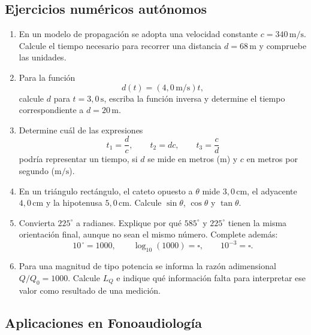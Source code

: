 \subsection*{Ejercicios numéricos autónomos}

\begin{enumerate}[label=\textbf{NA\arabic*.},leftmargin=*]
    \item En un modelo de propagación se adopta una velocidad constante \(c=340\,\text{m}/\text{s}\). Calcule el tiempo necesario para recorrer una distancia \(d=68\,\text{m}\) y compruebe las unidades.

    \item Para la función
    \[
        d(t)=(4{,}0\,\text{m}/\text{s})t,
    \]
    calcule \(d\) para \(t=3{,}0\,\text{s}\), escriba la función inversa y determine el tiempo correspondiente a \(d=20\,\text{m}\).

    \item Determine cuál de las expresiones
    \[
        t_1=\frac{d}{c},
        \qquad
        t_2=dc,
        \qquad
        t_3=\frac{c}{d}
    \]
    podría representar un tiempo, si \(d\) se mide en metros (\(\text{m}\)) y \(c\) en metros por segundo (\(\text{m}/\text{s}\)).

    \item En un triángulo rectángulo, el cateto opuesto a \(\theta\) mide \(3{,}0\,\text{cm}\), el adyacente \(4{,}0\,\text{cm}\) y la hipotenusa \(5{,}0\,\text{cm}\). Calcule \(\sin\theta\), \(\cos\theta\) y \(\tan\theta\).

    \item Convierta \(225^{\circ}\) a radianes. Explique por qué \(585^{\circ}\) y \(225^{\circ}\) tienen la misma orientación final, aunque no sean el mismo número. Complete además:
    \[
        10^{\,\square}=1000,
        \qquad
        \log_{10}(1000)=\square,
        \qquad
        10^{-3}=\square.
    \]

    \item Para una magnitud de tipo potencia se informa la razón adimensional \(Q/Q_0=1000\). Calcule \(L_Q\) e indique qué información falta para interpretar ese valor como resultado de una medición.
\end{enumerate}

\subsection*{Aplicaciones en Fonoaudiología}

